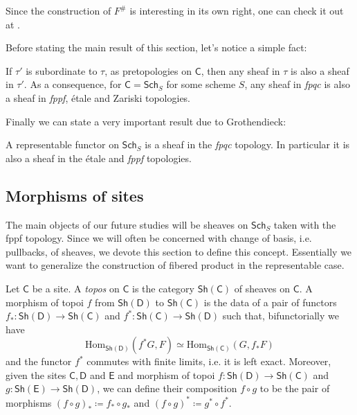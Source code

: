 \documentclass[../Main]{subfiles}
\begin{document}
\begin{rem}[]
	Since the construction of $F^\#$ is interesting in its own right, 
	one can check it out at
	\cite[\href{https://stacks.math.columbia.edu/tag/00W1}{Section 00W1}]{SP}.
\end{rem}


\noindent
Before stating the main result of this section, let's notice
a simple fact:
\begin{rem}[]
	If $\tau'$ is subordinate to $\tau$, as pretopologies on $\mathsf{C}$,
	then any sheaf in $\tau$ is also a sheaf in $\tau'$.
	As a consequence, for $\mathsf{C} = \mathsf{Sch}_{ S }$ for some scheme $S$,
	any sheaf in {\em fpqc} is also a sheaf in {\em fppf}, étale and Zariski topologies.
\end{rem}


\noindent
Finally we can state a very important result due to Grothendieck:
\begin{thm}\label{thm:reprFctSheaf}
	A representable functor on $\mathsf{Sch}_{ S }$ is a sheaf in the {\em fpqc} topology.
	In particular it is also a sheaf in the étale and {\em fppf} topologies.
\end{thm}



\subsection{Morphisms of sites}
The main objects of our future studies will be sheaves on
$\mathsf{Sch}_{ S }$ taken with the fppf topology.
Since we will often be concerned with change of basis, i.e. pullbacks,
of sheaves, we devote this section to define this concept.
Essentially we want to generalize the construction
of fibered product in the representable case.


\begin{defn}[Topoi]
	Let $\mathsf{C}$ be a site.
	A {\em topos} on $\mathsf{C}$ is the category $\mathsf{Sh}\left(\mathsf{C}\right)$
	of sheaves on $\mathsf{C}$.
	A morphism of topoi $f$ from $\mathsf{Sh}\left(\mathsf{D}\right)$
	to $\mathsf{Sh}\left(\mathsf{C}\right)$ is the data of a pair
	of functors $f_*\colon \mathsf{Sh}\left(\mathsf{D}\right) \to \mathsf{Sh}\left(\mathsf{C}\right)$
	and $f^*\colon \mathsf{Sh}\left(\mathsf{C}\right) \to \mathsf{Sh}\left(\mathsf{D}\right)$
	such that, bifunctorially we have
	\begin{equation*}
		\mathrm{Hom}_{\mathsf{Sh}(\mathsf{D})} \left( f^*G, F \right) \simeq
		\mathrm{Hom}_{\mathsf{Sh}(\mathsf{C})} \left( G, f_*F \right) 
	\end{equation*}
	and the functor $f^*$ commutes with finite limits, i.e. it
	is left exact.
	Moreover, given the sites $\mathsf{C}, \mathsf{D}$ and $\mathsf{E}$
	and morphism of topoi 
	$f\colon \mathsf{Sh}\left(\mathsf{D}\right) \to \mathsf{Sh}\left(\mathsf{C}\right)$ and
	$g\colon \mathsf{Sh}\left(\mathsf{E}\right) \to \mathsf{Sh}\left(\mathsf{D}\right)$,
	we can define their composition $f \circ g$
	to be the pair of morphisms $\left( f \circ g \right)_* \coloneqq f_* \circ g_*$
	and $\left( f \circ g \right)^* \coloneqq g^* \circ f^*$.
\end{defn}
\end{document}
